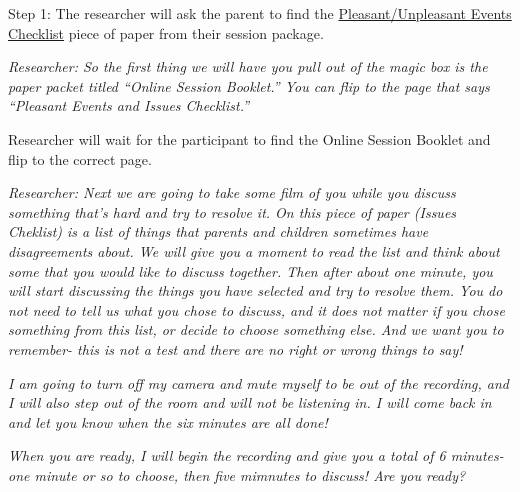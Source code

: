 \documentclass[]{book}
\begin{document}
Step 1:
The researcher will ask the parent to find the \href{https://ucla.app.box.com/file/630327764749}{Pleasant/Unpleasant Events Checklist} piece of paper from their session package.

\emph{Researcher: So the first thing we will have you pull out of the magic box is the paper packet titled ``Online Session Booklet.'' You can flip to the page that says ``Pleasant Events and Issues Checklist.''}

Researcher will wait for the participant to find the Online Session Booklet and flip to the correct page.

\emph{Researcher: Next we are going to take some film of you while you discuss something that's hard and try to resolve it. On this piece of paper (Issues Cheklist) is a list of things that parents and children sometimes have disagreements about. We will give you a moment to read the list and think about some that you would like to discuss together. Then after about one minute, you will start discussing the things you have selected and try to resolve them. You do not need to tell us what you chose to discuss, and it does not matter if you chose something from this list, or decide to choose something else. And we want you to remember- this is not a test and there are no right or wrong things to say!}

\emph{I am going to turn off my camera and mute myself to be out of the recording, and I will also step out of the room and will not be listening in. I will come back in and let you know when the six minutes are all done!}

\emph{When you are ready, I will begin the recording and give you a total of 6 minutes- one minute or so to choose, then five mimnutes to discuss! Are you ready?}
\end{document}
